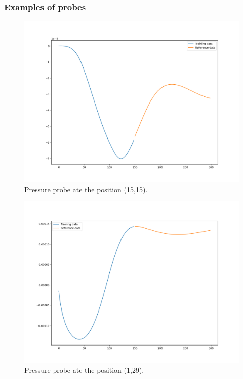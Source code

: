 \documentclass[xcolor=dvipsnames,10pt,aspectratio=169]{beamer}
\begin{document}
\begin{frame}\frametitle{Examples of probes}
	\begin{minipage}[h!]{0.49\textwidth}
		\begin{figure}
			\centering
			\includegraphics[clip=true, scale=0.25]{figuras/preassure_15_15.png}
	 		\caption{Pressure probe ate the position (15,15).}
		\end{figure}
	\end{minipage}
	\begin{minipage}[h!]{0.5\textwidth}
		\begin{figure}
			\centering
			\includegraphics[clip=true, scale=0.25]{figuras/preassure_1_29.png}
	 		\caption{Pressure probe ate the position (1,29).}
		\end{figure}
	\end{minipage}
\end{frame}
\end{document}
